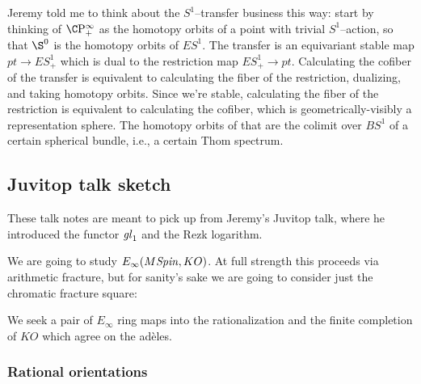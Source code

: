 Jeremy told me to think about the $S^1$--transfer business this way: start by thinking of $\CP^\infty_+$ as the homotopy orbits of a point with trivial $S^1$--action, so that $\S^0$ is the homotopy orbits of $ES^1$.  The transfer is an equivariant stable map $pt \to ES^1_+$ which is dual to the restriction map $ES^1_+ \to pt$.  Calculating the cofiber of the transfer is equivalent to calculating the fiber of the restriction, dualizing, and taking homotopy orbits.  Since we're stable, calculating the fiber of the restriction is equivalent to calculating the cofiber, which is geometrically-visibly a representation sphere.  The homotopy orbits of that are the colimit over $BS^1$ of a certain spherical bundle, i.e., a certain Thom spectrum.






\subsection{Juvitop talk sketch}
\newcommand{\spin}{\mathit{spin}}
\newcommand{\cts}{\mathrm{cts}}

These talk notes are meant to pick up from Jeremy's Juvitop talk, where he introduced the functor $\mathit{gl}_1$ and the Rezk logarithm.

We are going to study $E_\infty(M\mathit{Spin}, KO)$.  At full strength this proceeds via arithmetic fracture, but for sanity's sake we are going to consider just the chromatic fracture square:
\begin{center}
\end{center}
We seek a pair of $E_\infty$ ring maps into the rationalization and the finite completion of $KO$ which agree on the ad\`eles.




\subsubsection{Rational orientations}

